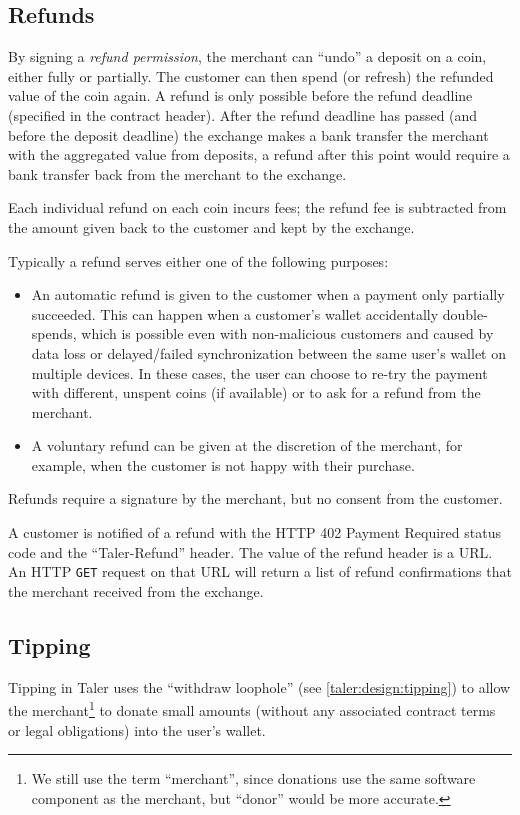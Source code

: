 \subsection{Refunds}
By signing a \emph{refund permission}, the merchant can ``undo'' a deposit on a
coin, either fully or partially.  The customer can then spend (or refresh) the
refunded value of the coin again.  A refund is only possible before the refund
deadline (specified in the contract header).  After the refund deadline has
passed (and before the deposit deadline) the exchange makes a bank transfer the
merchant with the aggregated value from deposits, a refund after this point
would require a bank transfer back from the merchant to the exchange.

Each individual refund on each coin incurs fees; the
refund fee is subtracted from the amount given back to the customer and kept by
the exchange.

Typically a refund serves either one of the following purposes:
\begin{itemize}
  \item An automatic refund is given to the customer when a payment only
    partially succeeded.  This can happen when a customer's wallet accidentally
    double-spends, which is possible even with non-malicious customers and caused by data
    loss or delayed/failed synchronization between the same user's wallet on
    multiple devices.  In these cases, the user can choose to re-try the
    payment with different, unspent coins (if available) or to ask for a refund
    from the merchant.
  \item A voluntary refund can be given at the discretion of the merchant,
    for example, when the customer is not happy with their purchase.
\end{itemize}
Refunds require a signature by the merchant, but no consent from the customer.

A customer is notified of a refund with the HTTP 402 Payment Required status
code and the ``Taler-Refund'' header.  The value of the refund header is a
URL. An HTTP \texttt{GET} request on that URL will return a list of refund confirmations that the
merchant received from the exchange.

\subsection{Tipping}
Tipping in Taler uses the ``withdraw loophole'' (see \ref{taler:design:tipping}) to allow the
merchant\footnote{We still use the term ``merchant'', since donations use the same software component
as the merchant, but ``donor'' would be more accurate.} to donate small amounts (without any associated contract terms or legal
obligations) into the user's wallet.

